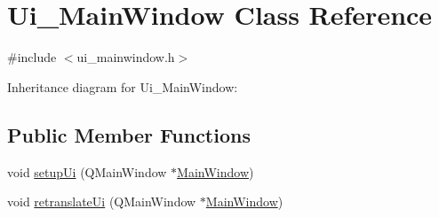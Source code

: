 \hypertarget{class_ui___main_window}{}\section{Ui\+\_\+\+Main\+Window Class Reference}
\label{class_ui___main_window}


{\ttfamily \#include $<$ui\+\_\+mainwindow.\+h$>$}



Inheritance diagram for Ui\+\_\+\+Main\+Window\+:
\subsection*{Public Member Functions}
\begin{DoxyCompactItemize}
\item 
void \hyperlink{class_ui___main_window_acf4a0872c4c77d8f43a2ec66ed849b58}{setup\+Ui} (Q\+Main\+Window $\ast$\hyperlink{class_main_window}{Main\+Window})
\item 
void \hyperlink{class_ui___main_window_a097dd160c3534a204904cb374412c618}{retranslate\+Ui} (Q\+Main\+Window $\ast$\hyperlink{class_main_window}{Main\+Window})
\end{DoxyCompactItemize}

